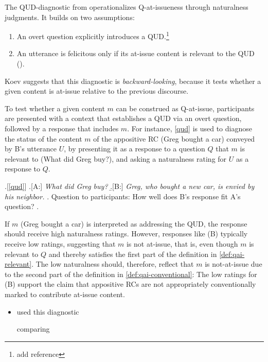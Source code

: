       The QUD-diagnostic from \citealt{tonhauser_diagnosing_2012} operationalizes Q-at-issueness through naturalness judgments. It builds on two assumptions:
      \begin{enumerate}
        \item An overt question explicitly introduces a QUD.\footnote{add reference}
        \item An utterance is felicitous only if its at-issue content is relevant to the QUD (\citealt{amaral_review_2007,tonhauser_diagnosing_2012}).
      \end{enumerate}

      Koev suggests that this diagnostic is \emph{backward-looking}, because it tests whether a given content is at-issue relative to the previous discourse.

      \noindent To test whether a given content $m$ can be construed as Q-at-issue, participants are presented with a context that establishes a QUD via an overt question, followed by a response that includes $m$. For instance, \ref{qud} is used to diagnose the status of the content $m$ of the appositive RC (Greg bought a car) conveyed by B's utterance $U$, by presenting it as a response to a question $Q$ that $m$ is relevant to (What did Greg buy?), and asking a naturalness rating for $U$ as a response to $Q$.

      \ex.[\ref{qud}]
        \a.[A:] \emph{What did Greg buy?}
        \b.[B:] \emph{Greg, who bought a new car, is envied by his neighbor.}
        \z.
        Question to participants: How well does B's response fit A's question?
      \z.

      If $m$ (Greg bought a car) is interpreted as addressing the QUD, the response should receive high naturalness ratings. However, responses like (B) typically receive low ratings, suggesting that $m$ is not at-issue, that is, even though $m$ is relevant to $Q$ and thereby satisfies the first part of the definition in \ref{def:qai-relevant}. The low naturalness should, therefore, reflect that $m$ is not-at-issue due to the second part of the definition in \ref{def:qai-conventional}: The low ratings for (B) support the claim that appositive RCs are not appropriately conventionally marked to contribute at-issue content.

      \begin{itemize}
        \item \citealt{chen_presuppositions_2024} used this diagnostic 

        comparing  

      \end{itemize}

